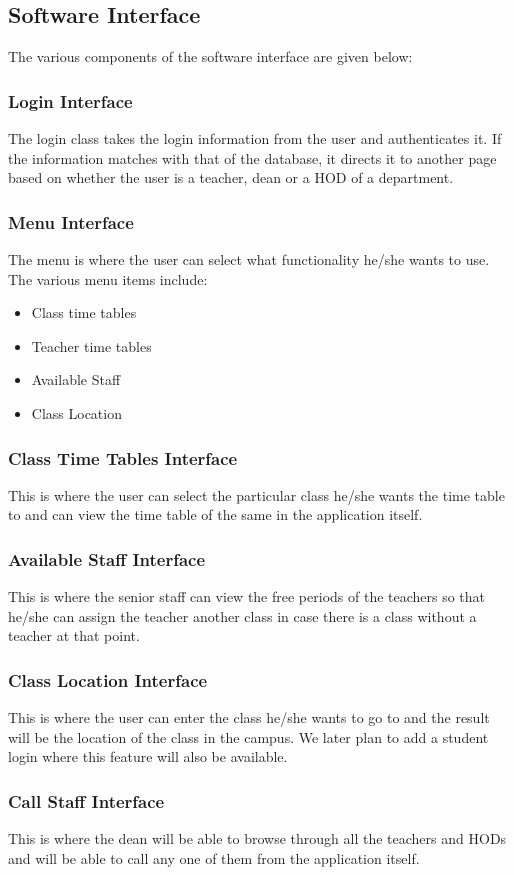 \documentclass[BTech]{srmuthesis}
\begin{document}
\subsection{Software Interface}
The various components of the software interface are given below:
\subsubsection{Login Interface}
The login class takes the login information from the user and authenticates it. If the information matches with that of the database, it directs it to another page based on whether the user is a teacher, dean or a HOD of a department.                          
\subsubsection{Menu Interface}
The menu is where the user can select what functionality he/she wants to use. The various menu items include:
\begin{itemize}
\item Class time tables
\item Teacher time tables
\item Available Staff
\item Class Location
\end{itemize}

\subsubsection{Class Time Tables Interface}
This is where the user can select the particular class he/she wants the time table to and can view the time table of the same in the application itself.
\subsubsection{Available Staff Interface}
This is where the senior staff can view the free periods of the teachers so that he/she can assign the teacher another class in case there is a class without a teacher at that point.
\subsubsection{Class Location Interface}
This is where the user can enter the class he/she wants to go to and the result will be the location of the class in the campus. We later plan to add a student login where this feature will also be available.
\subsubsection{Call Staff Interface}
This is where the dean will be able to browse through all the teachers and HODs and will be able to call any one of them from the application itself.
\end{document}
